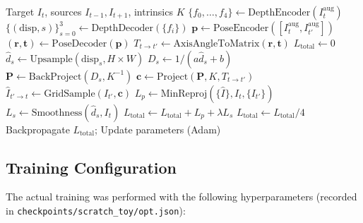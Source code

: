 \documentclass[10pt, a4paper, twocolumn]{article}
\begin{document}
\begin{algorithm}[H]
\caption{Monodepth2 Training Loop (Per Batch)}
\label{alg:train}
\begin{algorithmic}[1]
\REQUIRE Target $I_t$, sources $I_{t-1}, I_{t+1}$, intrinsics $K$
\STATE $\{f_0, \ldots, f_4\} \leftarrow \text{DepthEncoder}(I_t^{\text{aug}})$
\STATE $\{(\text{disp}, s)\}_{s=0}^{3} \leftarrow \text{DepthDecoder}(\{f_i\})$
    \STATE $\mathbf{p} \leftarrow \text{PoseEncoder}([I_t^{\text{aug}}, I_{t'}^{\text{aug}}])$
    \STATE $(\mathbf{r}, \mathbf{t}) \leftarrow \text{PoseDecoder}(\mathbf{p})$
    \STATE $T_{t \to t'} \leftarrow \text{AxisAngleToMatrix}(\mathbf{r}, \mathbf{t})$
\ENDFOR
\STATE $L_{\text{total}} \leftarrow 0$
    \STATE $\hat{d}_s \leftarrow \text{Upsample}(\text{disp}_s, H \times W)$
    \STATE $D_s \leftarrow 1 / (a\hat{d}_s + b)$
    \STATE $\mathbf{P} \leftarrow \text{BackProject}(D_s, K^{-1})$
        \STATE $\mathbf{c} \leftarrow \text{Project}(\mathbf{P}, K, T_{t \to t'})$
        \STATE $\hat{I}_{t' \to t} \leftarrow \text{GridSample}(I_{t'}, \mathbf{c})$
    \ENDFOR
    \STATE $L_p \leftarrow \text{MinReproj}(\{\hat{I}\}, I_t, \{I_{t'}\})$
    \STATE $L_s \leftarrow \text{Smoothness}(\hat{d}_s, I_t)$
    \STATE $L_{\text{total}} \leftarrow L_{\text{total}} + L_p + \lambda L_s$
\ENDFOR
\STATE $L_{\text{total}} \leftarrow L_{\text{total}} / 4$
\STATE Backpropagate $L_{\text{total}}$; Update parameters (Adam)
\end{algorithmic}
\end{algorithm}

\subsection{Training Configuration}

The actual training was performed with the following hyperparameters (recorded in \texttt{checkpoints/scratch\_toy/opt.json}):
\end{document}
